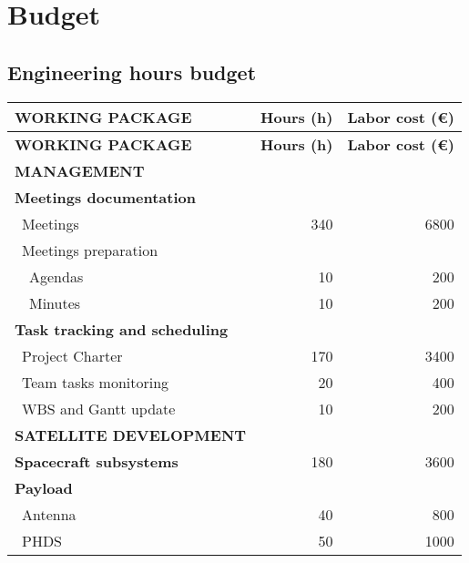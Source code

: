 %

\section{Budget}
\subsection{Engineering hours budget}

\begin{longtable}{| l | r | r | }
\hline
\rowcolor[gray]{0.65}	\textbf{WORKING PACKAGE} &  \textbf{Hours (h)}     & \textbf{Labor cost (\euro)}   \\ \hline
\hline
\endfirsthead

\hline
\rowcolor[gray]{0.65}	\textbf{WORKING PACKAGE} &  \textbf{Hours (h)}     & \textbf{Labor cost (\euro)}   \\
\hline
\endhead

\rowcolor[gray]{0.85} \textbf{MANAGEMENT} &  &  \\

	\textbf{Meetings documentation} & & \\
	   \blue ~Meetings & 340  & 6800  \\
	   \blue ~Meetings preparation & &   \\
	   ~~Agendas & 10 & 200 \\
	   ~~Minutes & 10 & 200 \\
	\hline
	\textbf{Task tracking and scheduling} & & \\
	   \blue ~Project Charter & 170 & 3400  \\
	   \blue ~Team tasks monitoring & 20 & 400  \\
	   \blue ~WBS and Gantt update & 10 & 200 \\

\rowcolor[gray]{0.85}	\textbf{SATELLITE DEVELOPMENT} &  &   \\
	
	\textbf{Spacecraft subsystems} & 180  & 3600 \\
	\hline
	\textbf{Payload} &   &  \\
	   \blue ~Antenna & 40  & 800  \\
	   \blue ~PHDS & 50  & 1000  \\


\end{longtable}
